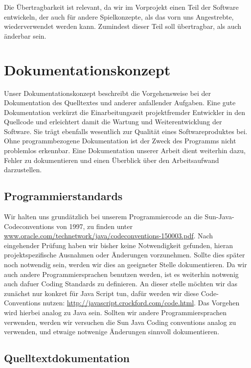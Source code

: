 \documentclass[11pt,a4paper]{article}
\begin{document}
Die Übertragbarkeit ist relevant, da wir im Vorprojekt einen Teil der Software entwickeln, der auch für andere Spielkonzepte, als das vorn uns Angestrebte, wiederverwendet werden kann.
Zumindest dieser Teil soll übertragbar, als auch änderbar sein.




\section{Dokumentationskonzept}

Unser Dokumentationskonzept beschreibt die Vorgehensweise bei der Dokumentation des Quelltextes und anderer anfallender Aufgaben. Eine gute Dokumentation verkürzt die Einarbeitungszeit projektfremder Entwickler in den Quellcode und erleichtert damit die Wartung und Weiterentwicklung der Software. Sie trägt ebenfalls wesentlich zur Qualität eines Softwareproduktes bei. Ohne programmbezogene Dokumentation ist der Zweck des Programms nicht problemlos erkennbar. Eine Dokumentation unserer Arbeit dient weiterhin dazu, Fehler zu dokumentieren und einen Überblick über den Arbeitsaufwand darzustellen.

\subsection{Programmierstandards}

Wir halten uns grundätzlich bei unserem Programmiercode an die Sun-Java-Codeconventions von 1997, zu finden unter \url{www.oracle.com/technetwork/java/codeconventions-150003.pdf}. Nach eingehender Prüfung haben wir bisher keine Notwendigkeit gefunden, hieran projektspezifische Ausnahmen oder Änderungen vorzunehmen. Sollte dies später noch notwendig sein, werden wir dies an geeigneter Stelle dokumentieren.
Da wir auch andere Programmiersprachen benutzen werden, ist es weiterhin notwenig auch dafuer Coding Standards zu definieren. An dieser stelle möchten wir das zunächst nur konkret für Java Script tun, dafür werden wir diese Code-Conventions nutzen:  \url{http://javascript.crockford.com/code.html}. Das Vorgehen wird hierbei analog zu Java sein. Sollten wir andere Programmiersprachen verwenden, werden wir versuchen die Sun Java Coding conventions analog zu verwenden, und etwaige notwenige Änderungen sinnvoll dokumentieren.

\subsection{Quelltextdokumentation}
\end{document}

